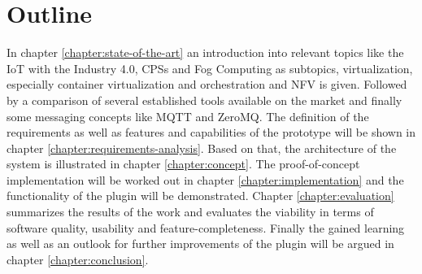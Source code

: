\section{Outline}
In chapter \ref{chapter:state-of-the-art} an introduction into relevant topics like the \ac{IoT} with the Industry 4.0, \acp{CPS} and Fog Computing as subtopics, virtualization, especially container virtualization and orchestration and \ac{NFV} is given.
Followed by a comparison of several established tools available on the market and finally some messaging concepts like \ac{MQTT} and ZeroMQ.
The definition of the requirements as well as features and capabilities of the prototype will be shown in chapter \ref{chapter:requirements-analysis}.
Based on that, the architecture of the system is illustrated in chapter \ref{chapter:concept}.
The proof-of-concept implementation will be worked out in chapter \ref{chapter:implementation} and the functionality of the plugin will be demonstrated.
Chapter \ref{chapter:evaluation} summarizes the results of the work and evaluates the viability in terms of software quality, usability and feature-completeness.
Finally the gained learning as well as an outlook for further improvements of the plugin will be argued in chapter \ref{chapter:conclusion}.


